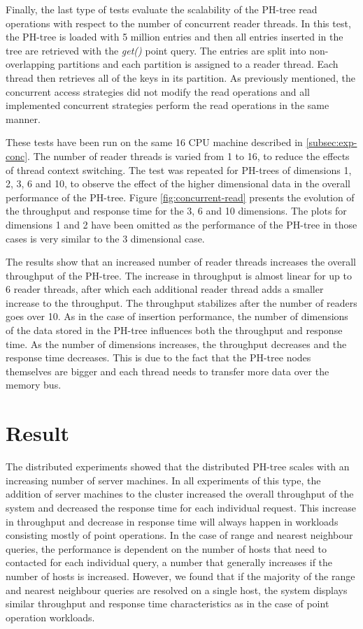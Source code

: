 \documentclass[11pt,a4paper]{globis-book}
\begin{document}
Finally, the last type of tests evaluate the scalability of the PH-tree read operations with respect to the number of concurrent reader threads. In this test, the PH-tree is loaded with 5 million entries and then all entries inserted in the tree are retrieved with the \textit{get()} point query. The entries are split into non-overlapping partitions and each partition is assigned to a reader thread. Each thread then retrieves all of the keys in its partition. As previously mentioned, the concurrent access strategies did not modify the read operations and all implemented concurrent strategies perform the read operations in the same manner. 

These tests have been run on the same 16 CPU machine described in \ref{subsec:exp-conc}. The number of reader threads is varied from 1 to 16, to reduce the effects of thread context switching. The test was repeated for PH-trees of dimensions 1, 2, 3, 6 and 10, to observe the effect of the higher dimensional data in the overall performance of the PH-tree. Figure \ref{fig:concurrent-read} presents the evolution of the throughput and response time for the 3, 6 and 10 dimensions. The plots for dimensions 1 and 2 have been omitted as the performance of the PH-tree in those cases is very similar to the 3 dimensional case. 

The results show that an increased number of reader threads increases the overall throughput of the PH-tree. The increase in throughput is almost linear for up to 6 reader threads, after which each additional reader thread adds a smaller increase to the throughput. The throughput stabilizes after the number of readers goes over 10. As in the case of insertion performance, the number of dimensions of the data stored in the PH-tree influences both the throughput and response time. As the number of dimensions increases, the throughput decreases and the response time decreases. This is due to the fact that the PH-tree nodes themselves are bigger and each thread needs to transfer more data over the memory bus.

\section{Result}
\label{sec:evaluation-results}

The distributed experiments showed that the distributed PH-tree scales with an increasing number of server machines. In all experiments of this type, the addition of server machines to the cluster increased the overall throughput of the system and decreased the response time for each individual request. This increase in throughput and decrease in response time will always happen in workloads consisting mostly of point operations. In the case of range and nearest neighbour queries, the performance is dependent on the number of hosts that need to contacted for each individual query, a number that generally increases if the number of hosts is increased. However, we found that if the majority of the range and nearest neighbour queries are resolved on a single host, the system displays similar throughput and response time characteristics as in the case of point operation workloads. 
\end{document}

